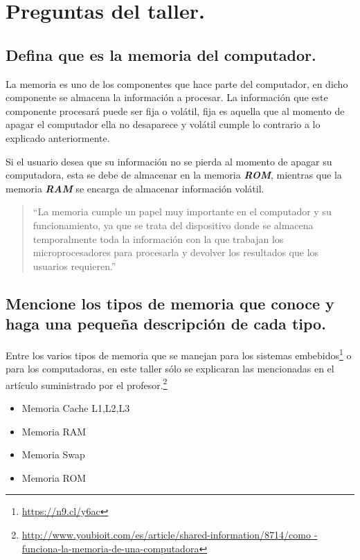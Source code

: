 \documentclass[12pt,letterpaper]{article}
\begin{document}
\newpage


\section{Preguntas del taller.}\label{preguntas}
    \subsection{Defina que es la memoria del computador.}

La memoria es uno de los componentes que hace parte del computador, en dicho componente se almacena la información a procesar. La información que este componente procesará puede ser fija o volátil, fija es aquella que al momento de apagar el computador ella no desaparece y volátil cumple lo contrario a lo explicado anteriormente.

Si el usuario desea que su información no se pierda al momento de apagar su computadora, esta se debe de almacenar en la memoria \textbf{\emph{ROM}}, mientras que la memoria \textbf{\textit{RAM}} se encarga de almacenar información volátil.

\begin{quote}
    ``La memoria cumple un papel muy importante en el computador y su funcionamiento, ya que se
    trata del dispositivo donde se almacena temporalmente toda la información con la que trabajan
    los microprocesadores para procesarla y devolver los resultados que los usuarios requieren.''\cite{GuiaProfesor}
\end{quote}

\subsection{Mencione los tipos de memoria que conoce y haga una pequeña descripción de cada tipo.}

Entre los varios tipos de memoria que se manejan para los sistemas embebidos\footnote{\url{https://n9.cl/y6ac}} o para los computadoras, en este taller sólo se explicaran las mencionadas en el artículo suministrado por el profesor.\footnote{\tiny{\url{http://www.youbioit.com/es/article/shared-information/8714/como
-funciona-la-memoria-de-una-computadora}}}

\begin{itemize}
    \item Memoria Cache L1,L2,L3
    \item Memoria RAM
    \item Memoria Swap
    \item Memoria ROM
\end{itemize}
\end{document}
